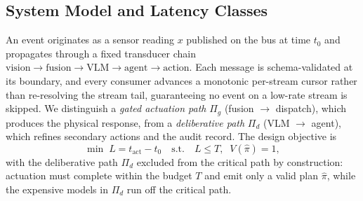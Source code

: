 \subsection{\textbf{System Model and Latency Classes}}
\label{sec:model}
An event originates as a sensor reading $x$ published on the bus at time $t_0$
and propagates through a fixed transducer chain
$\text{vision}\!\rightarrow\!\text{fusion}\!\rightarrow\!\text{VLM}\!\rightarrow\!
\text{agent}\!\rightarrow\!\text{action}$. Each message is schema-validated at its
boundary, and every consumer advances a monotonic per-stream cursor rather than
re-resolving the stream tail, guaranteeing no event on a low-rate stream is
skipped. We distinguish a \emph{gated actuation path} $\Pi_g$
(fusion $\rightarrow$ dispatch), which produces the physical response, from a
\emph{deliberative path} $\Pi_d$ (VLM $\rightarrow$ agent), which refines
secondary actions and the audit record. The design objective is
\begin{equation}
\min\; L = t_{\text{act}} - t_0
\quad\text{s.t.}\quad L \le T,\;\; V(\hat\pi)=1,
\label{eq:objective}
\end{equation}
with the deliberative path $\Pi_d$ excluded from the critical path by
construction: actuation must complete within the budget $T$ and emit only a valid
plan $\hat\pi$, while the expensive models in $\Pi_d$ run off the critical path.

